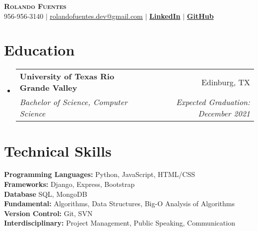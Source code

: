 \documentclass[letterpaper,11pt]{article}
\makeatletter
\newcommand{\resumeSubheading}[4]{
  \vspace{-2pt}\item
    \begin{tabular*}{0.97\textwidth}[t]{l@{\extracolsep{\fill}}r}
      \textbf{#1} & #2 \\
      \textit{\small#3} & \textit{\small #4} \\
    \end{tabular*}\vspace{-7pt}
}
\newcommand{\resumeSubHeadingListStart}{\begin{itemize}[leftmargin=0.15in, label={}]}
\newcommand{\resumeSubHeadingListEnd}{\end{itemize}}
\makeatother
\begin{document}
\begin{center}
    \textbf{\Huge \scshape Rolando Fuentes} \\ \vspace{1pt}
    \small 956-956-3140 $|$ \href{mailto:rolandofuentes.dev@gmail.com}{\underline{rolandofuentes.dev@gmail.com}} $|$ 
    \href{https://www.linkedin.com/in/rolando-fuentes/}{\textbf{LinkedIn}} $|$ \href{https://github.com/NoBaseCase}{\textbf{GitHub}}
\end{center}
\section{Education}
  \resumeSubHeadingListStart
    \resumeSubheading
      {University of Texas Rio Grande Valley}{Edinburg, TX}
      {Bachelor of Science, Computer Science}{Expected Graduation: December 2021}
  \resumeSubHeadingListEnd
\section{Technical Skills}
 \begin{itemize}[leftmargin=0.15in, label={}]
    \small{\item{
        \textbf{Programming Languages:} Python, JavaScript, HTML/CSS \\
        \textbf{Frameworks:} Django, Express, Bootstrap \\
        \textbf{Database} SQL, MongoDB \\
        \textbf{Fundamental:} Algorithms, Data Structures, Big-O Analysis of Algorithms \\ 
        \textbf{Version Control:} Git, SVN \\ 
        \textbf{Interdisciplinary:} Project Management, Public Speaking, Communication \\ }}
 \end{itemize}
%  
\end{document}
